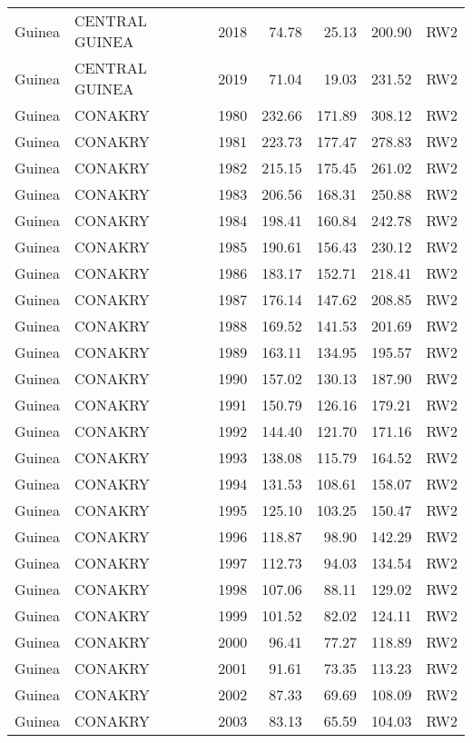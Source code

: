 \begin{longtable}{lllrrrl}
  Guinea & CENTRAL GUINEA & 2018 & 74.78 & 25.13 & 200.90 & RW2 \\ 
  Guinea & CENTRAL GUINEA & 2019 & 71.04 & 19.03 & 231.52 & RW2 \\ 
  Guinea & CONAKRY & 1980 & 232.66 & 171.89 & 308.12 & RW2 \\ 
  Guinea & CONAKRY & 1981 & 223.73 & 177.47 & 278.83 & RW2 \\ 
  Guinea & CONAKRY & 1982 & 215.15 & 175.45 & 261.02 & RW2 \\ 
  Guinea & CONAKRY & 1983 & 206.56 & 168.31 & 250.88 & RW2 \\ 
  Guinea & CONAKRY & 1984 & 198.41 & 160.84 & 242.78 & RW2 \\ 
  Guinea & CONAKRY & 1985 & 190.61 & 156.43 & 230.12 & RW2 \\ 
  Guinea & CONAKRY & 1986 & 183.17 & 152.71 & 218.41 & RW2 \\ 
  Guinea & CONAKRY & 1987 & 176.14 & 147.62 & 208.85 & RW2 \\ 
  Guinea & CONAKRY & 1988 & 169.52 & 141.53 & 201.69 & RW2 \\ 
  Guinea & CONAKRY & 1989 & 163.11 & 134.95 & 195.57 & RW2 \\ 
  Guinea & CONAKRY & 1990 & 157.02 & 130.13 & 187.90 & RW2 \\ 
  Guinea & CONAKRY & 1991 & 150.79 & 126.16 & 179.21 & RW2 \\ 
  Guinea & CONAKRY & 1992 & 144.40 & 121.70 & 171.16 & RW2 \\ 
  Guinea & CONAKRY & 1993 & 138.08 & 115.79 & 164.52 & RW2 \\ 
  Guinea & CONAKRY & 1994 & 131.53 & 108.61 & 158.07 & RW2 \\ 
  Guinea & CONAKRY & 1995 & 125.10 & 103.25 & 150.47 & RW2 \\ 
  Guinea & CONAKRY & 1996 & 118.87 & 98.90 & 142.29 & RW2 \\ 
  Guinea & CONAKRY & 1997 & 112.73 & 94.03 & 134.54 & RW2 \\ 
  Guinea & CONAKRY & 1998 & 107.06 & 88.11 & 129.02 & RW2 \\ 
  Guinea & CONAKRY & 1999 & 101.52 & 82.02 & 124.11 & RW2 \\ 
  Guinea & CONAKRY & 2000 & 96.41 & 77.27 & 118.89 & RW2 \\ 
  Guinea & CONAKRY & 2001 & 91.61 & 73.35 & 113.23 & RW2 \\ 
  Guinea & CONAKRY & 2002 & 87.33 & 69.69 & 108.09 & RW2 \\ 
  Guinea & CONAKRY & 2003 & 83.13 & 65.59 & 104.03 & RW2 \\ 

\end{longtable}
